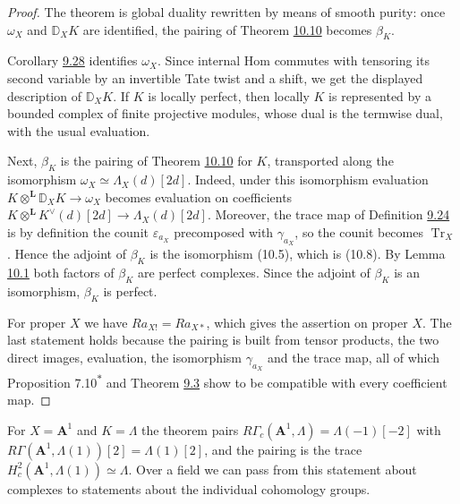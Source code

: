 \documentclass[11pt]{article}
\newcommand{\bpout}[1]{#1\textsuperscript{\hyperlink{bp-outside}{\ensuremath{\ast}}}}
\begin{document}
\begin{proof}[{Proof}]\label{bp138}%
The theorem is global duality rewritten by means of smooth purity: once \(\omega_X\) and \(\mathbb D_XK\) are identified, the pairing of Theorem \hyperref[bp132]{10.10} becomes \(\beta_K\).

Corollary \hyperref[bp98]{9.28} identifies \(\omega_X\). Since internal Hom commutes with tensoring its second variable by an invertible Tate twist and a shift, we get the displayed description of \(\mathbb D_XK\). If \(K\) is locally perfect, then locally \(K\) is represented by a bounded complex of finite projective modules, whose dual is the termwise dual, with the usual evaluation.

Next, \(\beta_K\) is the pairing of Theorem \hyperref[bp132]{10.10} for \(K\), transported along the isomorphism \(\omega_X\simeq\Lambda_X(d)[2d]\). Indeed, under this isomorphism evaluation \(K\otimes^{\mathbf L}\mathbb D_XK\to\omega_X\) becomes evaluation on coefficients \(K\otimes^{\mathbf L}K^\vee(d)[2d]\to\Lambda_X(d)[2d]\). Moreover, the trace map of Definition \hyperref[bp85]{9.24} is by definition the counit \(\varepsilon_{a_X}\) precomposed with \(\gamma_{a_X}\), so the counit becomes \(\operatorname{Tr}_X\). Hence the adjoint of \(\beta_K\) is the isomorphism (10.5), which is (10.8). By Lemma \hyperref[bp105]{10.1} both factors of \(\beta_K\) are perfect complexes. Since the adjoint of \(\beta_K\) is an isomorphism, \(\beta_K\) is perfect.

For proper \(X\) we have \(Ra_{X!}=Ra_{X*}\), which gives the assertion on proper \(X\). The last statement holds because the pairing is built from tensor products, the two direct images, evaluation, the isomorphism \(\gamma_{a_X}\) and the trace map, all of which Proposition \bpout{7.10} and Theorem \hyperref[bp11]{9.3} show to be compatible with every coefficient map.
\end{proof}

\label{bp139}%
For \(X=\mathbf A^1\) and \(K=\Lambda\) the theorem pairs \(R\Gamma_c(\mathbf A^1,\Lambda)=\Lambda(-1)[-2]\) with \(R\Gamma(\mathbf A^1,\Lambda(1))[2]=\Lambda(1)[2]\), and the pairing is the trace \(H^2_c(\mathbf A^1,\Lambda(1))\simeq\Lambda\). Over a field we can pass from this statement about complexes to statements about the individual cohomology groups.
\end{document}
